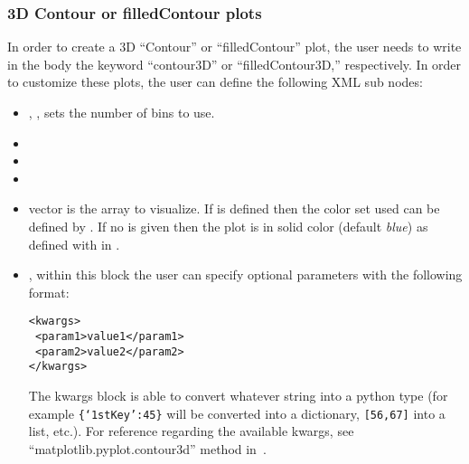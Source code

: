 \subsubsection{3D Contour or filledContour plots}
In order to create a 3D ``Contour'' or ``filledContour'' plot, the user needs
to write in the  body the keyword ``contour3D'' or ``filledContour3D,'' respectively.
%
In order to customize these plots, the user can define the following XML sub
nodes:
\begin{itemize}
  \item {}, , sets the
  number of bins to use.
  \item {}
  \item {}
  \item {}
  \item {} vector is the array to visualize.  If  is defined then the color set used can be defined by . 
  If no  is given then the plot is in solid color (default \textit{blue}) as defined with  in .
  \item {}, within this block the user can specify optional
  parameters with the following format:

\begin{lstlisting}[style=XML]
<kwargs>
 <param1>value1</param1>
 <param2>value2</param2>
</kwargs>
\end{lstlisting}

  The kwargs block is able to convert whatever string into a python type (for
  example  \texttt{\{`1stKey':45\}} will
  be converted into a dictionary, 
   \texttt{[56,67]}  into a list, etc.).
  For reference regarding the available kwargs, see
  ``matplotlib.pyplot.contour3d'' method in~\cite{MatPlotLib}.
\end{itemize}


